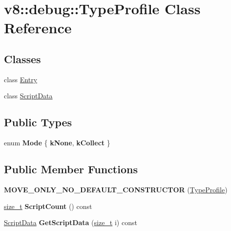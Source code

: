 \hypertarget{classv8_1_1debug_1_1TypeProfile}{}\section{v8\+:\+:debug\+:\+:Type\+Profile Class Reference}
\label{classv8_1_1debug_1_1TypeProfile}
\subsection*{Classes}
\begin{DoxyCompactItemize}
\item 
class \mbox{\hyperlink{classv8_1_1debug_1_1TypeProfile_1_1Entry}{Entry}}
\item 
class \mbox{\hyperlink{classv8_1_1debug_1_1TypeProfile_1_1ScriptData}{Script\+Data}}
\end{DoxyCompactItemize}
\subsection*{Public Types}
\begin{DoxyCompactItemize}
\item 
\mbox{\label{classv8_1_1debug_1_1TypeProfile_abad2c0659c23ecd2a6165bf5e5abb894}} 
enum {\bfseries Mode} \{ {\bfseries k\+None}, 
{\bfseries k\+Collect}
 \}
\end{DoxyCompactItemize}
\subsection*{Public Member Functions}
\begin{DoxyCompactItemize}
\item 
\mbox{\label{classv8_1_1debug_1_1TypeProfile_a77792bcc0253aa61c841a12c72335e38}} 
{\bfseries M\+O\+V\+E\+\_\+\+O\+N\+L\+Y\+\_\+\+N\+O\+\_\+\+D\+E\+F\+A\+U\+L\+T\+\_\+\+C\+O\+N\+S\+T\+R\+U\+C\+T\+OR} (\mbox{\hyperlink{classv8_1_1debug_1_1TypeProfile}{Type\+Profile}})
\item 
\mbox{\label{classv8_1_1debug_1_1TypeProfile_ade6cd16d478211e11b332120bb035570}} 
\mbox{\hyperlink{classsize__t}{size\+\_\+t}} {\bfseries Script\+Count} () const
\item 
\mbox{\label{classv8_1_1debug_1_1TypeProfile_af3cf2dd554ba024afb4cec3fc5e1ff3c}} 
\mbox{\hyperlink{classv8_1_1debug_1_1TypeProfile_1_1ScriptData}{Script\+Data}} {\bfseries Get\+Script\+Data} (\mbox{\hyperlink{classsize__t}{size\+\_\+t}} i) const
\end{DoxyCompactItemize}
